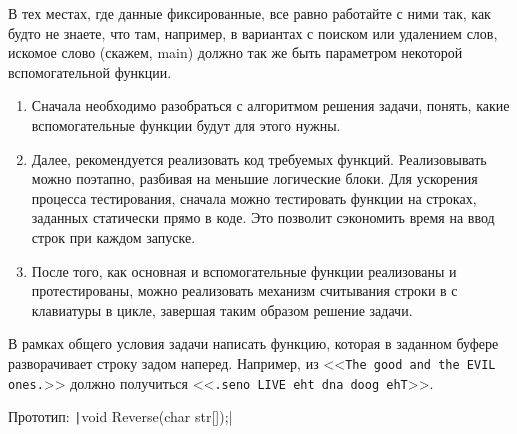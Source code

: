 В тех местах, где данные фиксированные, все равно работайте с ними так, как будто не знаете, что там, например, в вариантах с поиском или удалением слов, искомое слово (скажем, main) должно так же быть параметром некоторой вспомогательной функции.
\begin{comment}
\begin{itemize}
    \item Тут нужно напомнить, что у нас называется строкой, что это просто массив символов, а то и просто чисел-кодов с нулем на конце
    \item Можно еще побеседовать про разбиение на подзадачи. Подсказать, на какие логично фунции разбивать программу. Например, поиск слов если нужен и тп.
    \item Про вспомогательные функции - вычисление длины строки isalnum и тп.
\end{itemize}
\end{comment}
\zzsectionPLAN
\begin{enumerate}
	\item Сначала необходимо разобраться с алгоритмом решения задачи, понять, какие вспомогательные функции будут для этого нужны.
	\item Далее, рекомендуется реализовать код требуемых функций. Реализовывать можно поэтапно, разбивая на меньшие логические блоки. Для ускорения процесса тестирования, сначала можно тестировать функции на строках, заданных статически прямо в коде. Это позволит сэкономить время на ввод строк при каждом запуске.
	\item После того, как основная и вспомогательные функции реализованы и протестированы, можно реализовать механизм считывания строки в с клавиатуры в цикле, завершая таким образом решение задачи.
\end{enumerate}


\zzsectionVARIATIONS


\begin{zztask}
В рамках общего условия задачи написать функцию, которая в заданном буфере
разворачивает строку задом наперед.
Например, из
<<\texttt{The good and the EVIL ones.}>>
должно получиться
<<\texttt{.seno LIVE eht dna doog ehT}>>.

Прототип: \texttt|void Reverse(char str[]);|
\end{zztask}

